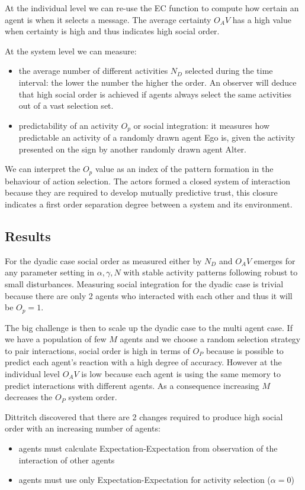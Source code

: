 At the individual level we can re-use the EC function to compute how certain
an agent is when it selects a message.
The average certainty $O_AV$ has a high value when certainty is high and thus
indicates high social order.

At the system level we can measure:
\begin{itemize}
 \item the average number of different activities $N_D$ selected during the
time interval: the lower the number the higher the order. An observer will
deduce that high social order is achieved if agents always select the same
activities out of a vast selection set.
 \item predictability of an activity $O_p$ or social integration: it measures
how predictable an activity of a randomly drawn agent Ego is, given the
activity presented on the sign by another randomly drawn agent Alter.
\end{itemize}

We can interpret the $O_p$ value as an index of the pattern formation in
the behaviour of action selection. The actors formed a closed system of
interaction because they are required to develop mutually predictive trust,
this closure indicates a first order separation degree between a system and its environment.

\subsection{Results}
For the dyadic case social order as measured either by $N_D$ and $O_AV$ emerges
for any parameter setting in $\alpha,\gamma, N$ with stable activity patterns
following robust to small disturbances.
Measuring social integration for the dyadic case is trivial because there are
only 2 agents who interacted with each other and thus it will be $O_p=1$.

The big challenge is then to scale up the dyadic case to the multi agent case.
If we have a population of few $M$ agents and we choose a random selection strategy
to pair interactions,
social order is high in terms of $O_P$ because is possible to predict each agent's 
reaction with a high degree of accuracy.
However at the individual level $O_AV$ is low because each agent is using the
 same memory to predict interactions with different agents.
As a consequence increasing $M$ decreases the $O_P$ system order.

Dittritch discovered that there are 2 changes required to produce high social
order with an increasing number of agents:
\begin{itemize}
 \item agents must calculate Expectation-Expectation from observation of the interaction of other agents
 \item agents must use only Expectation-Expectation for activity selection ($\alpha=0$)
\end{itemize}

